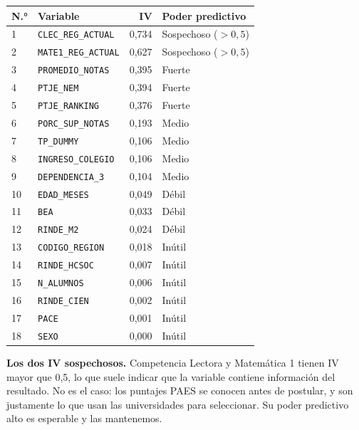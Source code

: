 \documentclass[11pt]{article}
\begin{document}
\begin{center}
\begin{tabular}{llrl}
\toprule
\textbf{N.°} & \textbf{Variable} & \textbf{IV} & \textbf{Poder predictivo} \\
\midrule
1  & \texttt{CLEC\_REG\_ACTUAL}             & 0,734 & Sospechoso ($>0{,}5$) \\
2  & \texttt{MATE1\_REG\_ACTUAL}            & 0,627 & Sospechoso ($>0{,}5$) \\
3  & \texttt{PROMEDIO\_NOTAS}               & 0,395 & Fuerte \\
4  & \texttt{PTJE\_NEM}                     & 0,394 & Fuerte \\
5  & \texttt{PTJE\_RANKING}                 & 0,376 & Fuerte \\
6  & \texttt{PORC\_SUP\_NOTAS}              & 0,193 & Medio \\
7  & \texttt{TP\_DUMMY}                     & 0,106 & Medio \\
8  & \texttt{INGRESO\_COLEGIO}              & 0,106 & Medio \\
9  & \texttt{DEPENDENCIA\_3}                & 0,104 & Medio \\
10 & \texttt{EDAD\_MESES}                   & 0,049 & Débil \\
11 & \texttt{BEA}                           & 0,033 & Débil \\
12 & \texttt{RINDE\_M2}                     & 0,024 & Débil \\
\midrule
\rowcolor{gray!15}
13 & \texttt{CODIGO\_REGION}                & 0,018 & Inútil \\
\rowcolor{gray!15}
14 & \texttt{RINDE\_HCSOC}                  & 0,007 & Inútil \\
\rowcolor{gray!15}
15 & \texttt{N\_ALUMNOS}                    & 0,006 & Inútil \\
\rowcolor{gray!15}
16 & \texttt{RINDE\_CIEN}                   & 0,002 & Inútil \\
\rowcolor{gray!15}
17 & \texttt{PACE}                          & 0,001 & Inútil \\
\rowcolor{gray!15}
18 & \texttt{SEXO}                          & 0,000 & Inútil \\
\bottomrule
\end{tabular}
\end{center}

\textbf{Los dos IV sospechosos.} Competencia Lectora y Matemática 1
tienen IV mayor que 0,5, lo que suele indicar que la variable contiene
información del resultado. No es el caso: los puntajes PAES se conocen
antes de postular, y son justamente lo que usan las universidades para
seleccionar. Su poder predictivo alto es esperable y las mantenemos.
\end{document}
